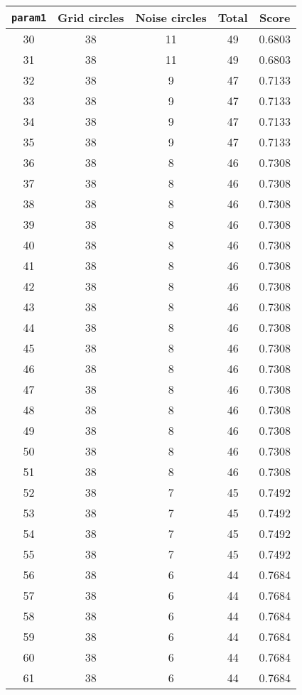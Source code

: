 \documentclass[letterpaper, 12pt]{article}
\begin{document}
\begin{longtable}{|c|c|c|c|c|}
\hline
\textbf{\texttt{param1}} & \textbf{Grid circles} & \textbf{Noise circles} & \textbf{Total} & \textbf{Score} \\
\hline
30 & 38 & 11 & 49 & 0.6803 \\
\hline
31 & 38 & 11 & 49 & 0.6803 \\
\hline
32 & 38 & 9 & 47 & 0.7133 \\
\hline
33 & 38 & 9 & 47 & 0.7133 \\
\hline
34 & 38 & 9 & 47 & 0.7133 \\
\hline
35 & 38 & 9 & 47 & 0.7133 \\
\hline
36 & 38 & 8 & 46 & 0.7308 \\
\hline
37 & 38 & 8 & 46 & 0.7308 \\
\hline
38 & 38 & 8 & 46 & 0.7308 \\
\hline
39 & 38 & 8 & 46 & 0.7308 \\
\hline
40 & 38 & 8 & 46 & 0.7308 \\
\hline
41 & 38 & 8 & 46 & 0.7308 \\
\hline
42 & 38 & 8 & 46 & 0.7308 \\
\hline
43 & 38 & 8 & 46 & 0.7308 \\
\hline
44 & 38 & 8 & 46 & 0.7308 \\
\hline
45 & 38 & 8 & 46 & 0.7308 \\
\hline
46 & 38 & 8 & 46 & 0.7308 \\
\hline
47 & 38 & 8 & 46 & 0.7308 \\
\hline
48 & 38 & 8 & 46 & 0.7308 \\
\hline
49 & 38 & 8 & 46 & 0.7308 \\
\hline
50 & 38 & 8 & 46 & 0.7308 \\
\hline
51 & 38 & 8 & 46 & 0.7308 \\
\hline
52 & 38 & 7 & 45 & 0.7492 \\
\hline
53 & 38 & 7 & 45 & 0.7492 \\
\hline
54 & 38 & 7 & 45 & 0.7492 \\
\hline
55 & 38 & 7 & 45 & 0.7492 \\
\hline
56 & 38 & 6 & 44 & 0.7684 \\
\hline
57 & 38 & 6 & 44 & 0.7684 \\
\hline
58 & 38 & 6 & 44 & 0.7684 \\
\hline
59 & 38 & 6 & 44 & 0.7684 \\
\hline
60 & 38 & 6 & 44 & 0.7684 \\
\hline
61 & 38 & 6 & 44 & 0.7684 \\

\end{longtable}
\end{document}
